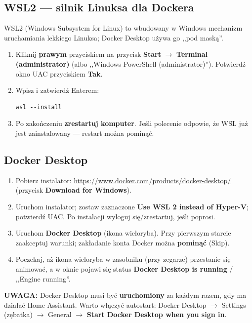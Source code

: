 \documentclass[11pt,a4paper]{article}
\newcommand{\uwaga}[1]{\par\medskip\noindent\textcolor{warnred}{\textbf{UWAGA:}} #1\par\medskip}
\begin{document}
\subsection{WSL2 --- silnik Linuksa dla Dockera}

WSL2 (Windows Subsystem for Linux) to wbudowany w Windows mechanizm uruchamiania lekkiego Linuksa; Docker Desktop używa go ,,pod maską''.

\begin{enumerate}
\item Kliknij \textbf{prawym} przyciskiem na przycisk \textbf{Start} $\to$ \textbf{Terminal (administrator)} (albo ,,Windows PowerShell (administrator)''). Potwierdź okno UAC przyciskiem \textbf{Tak}.
\item Wpisz i zatwierdź Enterem:
\begin{lstlisting}
wsl --install
\end{lstlisting}
\item Po zakończeniu \textbf{zrestartuj komputer}. Jeśli polecenie odpowie, że WSL już jest zainstalowany --- restart można pominąć.
\end{enumerate}

\subsection{Docker Desktop}

\begin{enumerate}
\item Pobierz instalator: \url{https://www.docker.com/products/docker-desktop/} (przycisk \textbf{Download for Windows}).
\item Uruchom instalator; zostaw zaznaczone \textbf{Use WSL 2 instead of Hyper-V}; potwierdź UAC. Po instalacji wyloguj się/zrestartuj, jeśli poprosi.
\item Uruchom \textbf{Docker Desktop} (ikona wieloryba). Przy pierwszym starcie zaakceptuj warunki; zakładanie konta Docker można \textbf{pominąć} (Skip).
\item Poczekaj, aż ikona wieloryba w zasobniku (przy zegarze) przestanie się animować, a w oknie pojawi się status \textbf{Docker Desktop is running} / ,,Engine running''.
\end{enumerate}

\uwaga{Docker Desktop musi być \textbf{uruchomiony} za każdym razem, gdy ma działać Home Assistant. Warto włączyć autostart: Docker Desktop $\to$ Settings (zębatka) $\to$ General $\to$ \textbf{Start Docker Desktop when you sign in}.}
\end{document}
